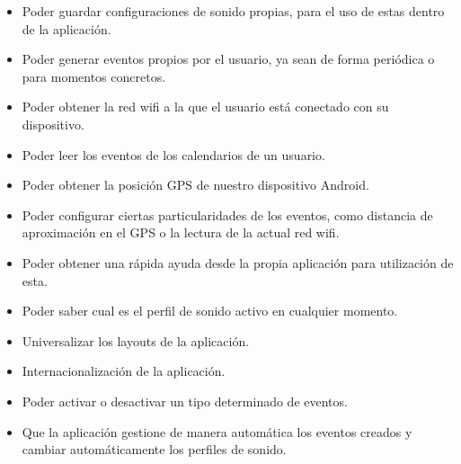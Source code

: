 \begin{itemize}
	\item Poder guardar configuraciones de sonido propias, para el uso de estas dentro de la aplicación.
	\item Poder generar eventos propios por el usuario, ya sean de forma periódica o para momentos concretos.
	\item Poder obtener la red wifi a la que el usuario está conectado con su dispositivo.
	\item Poder leer los eventos de los calendarios de un usuario.
	\item Poder obtener la posición GPS de nuestro dispositivo Android.
	\item Poder configurar ciertas particularidades de los eventos, como distancia de aproximación en el GPS o la lectura de la actual red wifi.
	\item Poder obtener una rápida ayuda desde la propia aplicación para utilización de esta.
	\item Poder saber cual es el perfil de sonido activo en cualquier momento.
	\item Universalizar los layouts de la aplicación.
	\item Internacionalización de la aplicación.
	\item Poder activar o desactivar un tipo determinado de eventos.
	\item Que la aplicación gestione de manera automática los eventos creados y cambiar automáticamente los perfiles de sonido.
\end{itemize}